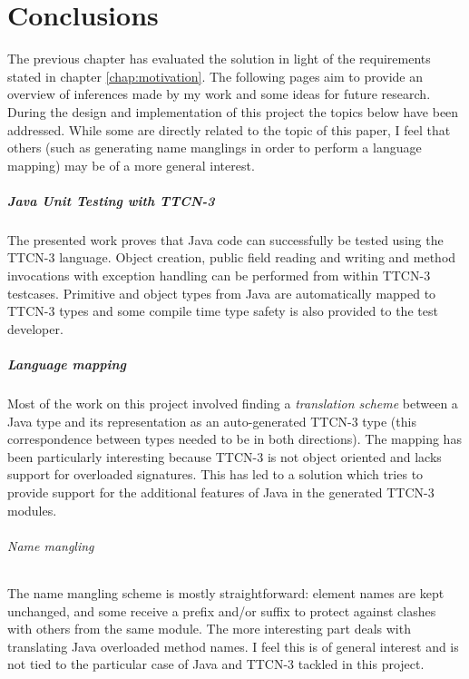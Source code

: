 \chapter{Conclusions}
\label{chap:conclusions}

The previous chapter has evaluated the solution
in light of the requirements stated in chapter \ref{chap:motivation}.
The following pages aim to provide
an overview of inferences made by my work
and some ideas for future research.
During the design and implementation of this project
the topics below have been addressed.
While some are directly related to the topic of this paper,
I feel that others
(such as generating name manglings in order to perform a language mapping)
may be of a more general interest.

\paragraph{Java Unit Testing with \ac{TTCN-3}}
The presented work proves that Java code can successfully be tested
using the \ac{TTCN-3} language.
Object creation, public field reading and writing and
method invocations with exception handling
can be performed from within \ac{TTCN-3} testcases.
Primitive and object types from Java
are automatically mapped to \ac{TTCN-3} types
and some compile time type safety is also provided to the test developer.

\paragraph{Language mapping}
Most of the work on this project
involved finding a \emph{translation scheme} between a Java type
and its representation as an auto-generated \ac{TTCN-3} type
(this correspondence between types needed to be in both directions).
The mapping has been particularly interesting because \ac{TTCN-3}
is not object oriented and lacks support for overloaded signatures.
This has led to a solution which tries to provide support
for the additional features of Java in the generated \ac{TTCN-3} modules.

\subparagraph{Name mangling}
The name mangling scheme is mostly straightforward:
element names are kept unchanged, and some receive a prefix and/or suffix
to protect against clashes with others from the same module.
The more interesting part deals with translating Java overloaded method names.
I feel this is of general interest and is not tied to the particular case
of Java and \ac{TTCN-3} tackled in this project.

